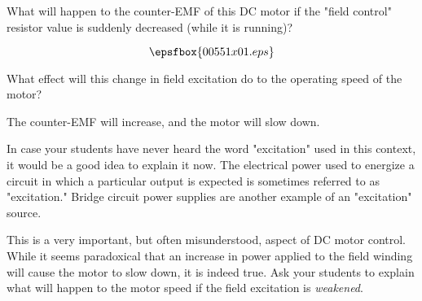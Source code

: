 

What will happen to the counter-EMF of this DC motor if the "field control" resistor value is suddenly decreased (while it is running)?

$$\epsfbox{00551x01.eps}$$

What effect will this change in field excitation do to the operating speed of the motor?







The counter-EMF will increase, and the motor will slow down.







In case your students have never heard the word "excitation" used in this context, it would be a good idea to explain it now.  The electrical power used to energize a circuit in which a particular output is expected is sometimes referred to as "excitation."  Bridge circuit power supplies are another example of an "excitation" source.

This is a very important, but often misunderstood, aspect of DC motor control.  While it seems paradoxical that an increase in power applied to the field winding will cause the motor to slow down, it is indeed true.  Ask your students to explain what will happen to the motor speed if the field excitation is {\it weakened}.




